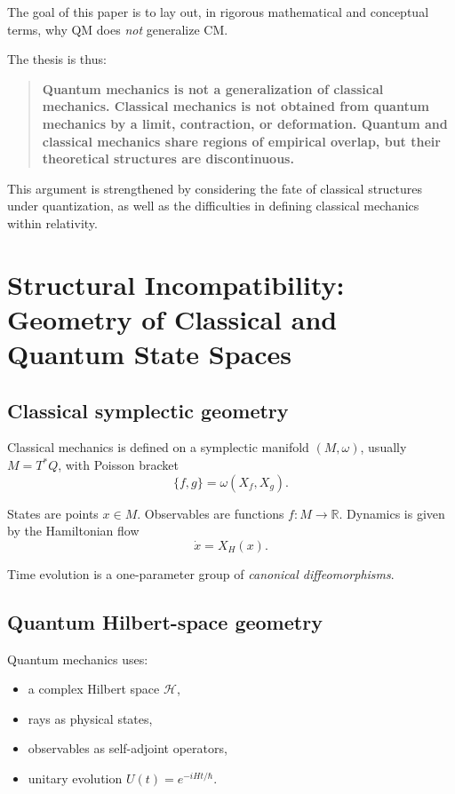 \documentclass[12pt]{article}
\begin{document}
The goal of this paper is to lay out, in rigorous mathematical and conceptual terms, why QM does \emph{not} generalize CM.

The thesis is thus:

\begin{quote}
    \textbf{Quantum mechanics is not a generalization of classical mechanics. Classical mechanics is not obtained from quantum mechanics by a limit, contraction, or deformation. Quantum and classical mechanics share regions of empirical overlap, but their theoretical structures are discontinuous.}
\end{quote}

This argument is strengthened by considering the fate of classical structures under quantization, as well as the difficulties in defining classical mechanics within relativity.

\section{Structural Incompatibility: Geometry of Classical and Quantum State Spaces}

\subsection{Classical symplectic geometry}

Classical mechanics is defined on a symplectic manifold $(M,\omega)$, usually $M = T^*Q$, with Poisson bracket
\begin{equation}
    \{f,g\} = \omega(X_f,X_g).
\end{equation}

States are points $x\in M$. Observables are functions $f\colon M\to\mathbb{R}$. Dynamics is given by the Hamiltonian flow
\[
\dot{x} = X_H(x).
\]

Time evolution is a one-parameter group of \emph{canonical diffeomorphisms}.

\subsection{Quantum Hilbert-space geometry}

Quantum mechanics uses:
\begin{itemize}
    \item a complex Hilbert space $\mathcal{H}$,
    \item rays as physical states,
    \item observables as self-adjoint operators,
    \item unitary evolution $U(t) = e^{-iHt/\hbar}$.
\end{itemize}
\end{document}
